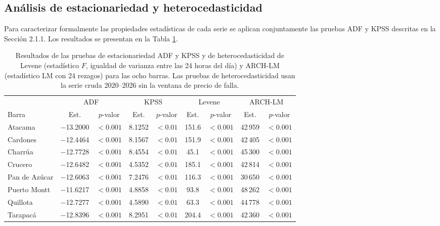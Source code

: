 \subsection{Análisis de estacionariedad y heterocedasticidad}

Para caracterizar formalmente las propiedades estadísticas de cada serie se aplican conjuntamente las pruebas ADF y KPSS descritas en la Sección 2.1.1. Los resultados se presentan en la Tabla \ref{tab:estacionariedad}.

\begin{table}[htbp]
    \centering
    \small
    \begin{tabular}{lcccccccc}
        \toprule
        & \multicolumn{2}{c}{ADF} & \multicolumn{2}{c}{KPSS} & \multicolumn{2}{c}{Levene} & \multicolumn{2}{c}{ARCH-LM} \\
        \cmidrule(lr){2-3} \cmidrule(lr){4-5} \cmidrule(lr){6-7} \cmidrule(lr){8-9}
        Barra & Est. & $p$-valor & Est. & $p$-valor & Est. & $p$-valor & Est. & $p$-valor \\
        \midrule
        Atacama       & $-$13.2000 & $<0.001$ & 8.1252 & $<0.01$ & 151.6 & $<0.001$ & 42\,959 & $<0.001$ \\
        Cardones      & $-$12.4464 & $<0.001$ & 8.1567 & $<0.01$ & 151.9 & $<0.001$ & 42\,405 & $<0.001$ \\
        Charrúa       & $-$12.7728 & $<0.001$ & 8.4554 & $<0.01$ &  45.1 & $<0.001$ & 45\,300 & $<0.001$ \\
        Crucero       & $-$12.6482 & $<0.001$ & 4.5352 & $<0.01$ & 185.1 & $<0.001$ & 42\,814 & $<0.001$ \\
        Pan de Azúcar & $-$12.6063 & $<0.001$ & 7.2476 & $<0.01$ & 116.3 & $<0.001$ & 30\,650 & $<0.001$ \\
        Puerto Montt  & $-$11.6217 & $<0.001$ & 4.8858 & $<0.01$ &  93.8 & $<0.001$ & 48\,262 & $<0.001$ \\
        Quillota      & $-$12.7277 & $<0.001$ & 4.5890 & $<0.01$ &  63.3 & $<0.001$ & 44\,778 & $<0.001$ \\
        Tarapacá      & $-$12.8396 & $<0.001$ & 8.2951 & $<0.01$ & 204.4 & $<0.001$ & 42\,360 & $<0.001$ \\
        \bottomrule
    \end{tabular}
    \caption{Resultados de las pruebas de estacionariedad ADF y KPSS y de heterocedasticidad de Levene (estadístico $F$, igualdad de varianza entre las 24 horas del día) y ARCH-LM (estadístico LM con 24 rezagos) para las ocho barras. Las pruebas de heterocedasticidad usan la serie cruda 2020--2026 sin la ventana de precio de falla.}
    \label{tab:estacionariedad}
\end{table}

